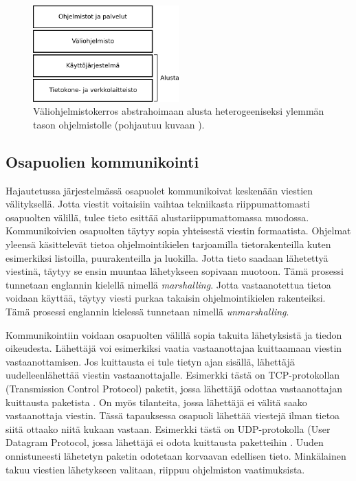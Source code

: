 \begin{figure}[ht!]
	\includegraphics[width=0.5\textwidth]{pictures/middleware-architecture.png}
	\caption{Väliohjelmistokerros abstrahoimaan alusta heterogeeniseksi ylemmän tason ohjelmistolle (pohjautuu kuvaan \mbox{\cite[s.~52]{distributed-systems-concepts-and-design}}).}
	\label{fig:middleware-architecture}
\end{figure}


\subsection{Osapuolien kommunikointi}
Hajautetussa järjestelmässä osapuolet kommunikoivat keskenään viestien välityksellä. Jotta viestit voitaisiin vaihtaa tekniikasta riippumattomasti osapuolten välillä, tulee tieto esittää alustariippumattomassa muodossa. Kommunikoivien osapuolten täytyy sopia yhteisestä viestin formaatista. Ohjelmat yleensä käsittelevät tietoa ohjelmointikielen tarjoamilla tietorakenteilla kuten esimerkiksi listoilla, puurakenteilla ja luokilla. Jotta tieto saadaan lähetettyä viestinä, täytyy se ensin muuntaa lähetykseen sopivaan muotoon. Tämä prosessi tunnetaan englannin kielellä nimellä \emph{marshalling}. Jotta vastaanotettua tietoa voidaan käyttää, täytyy viesti purkaa takaisin ohjelmointikielen rakenteiksi. Tämä prosessi englannin kielessä tunnetaan nimellä \emph{unmarshalling}. \mbox{\cite[s.~158]{distributed-systems-concepts-and-design}}

Kommunikointiin voidaan osapuolten välillä sopia takuita lähetyksistä ja tiedon oikeudesta. Lähettäjä voi esimerkiksi vaatia vastaanottajaa kuittaamaan viestin vastaanottamisen. Jos kuittausta ei tule tietyn ajan sisällä, lähettäjä uudelleenlähettää viestin vastaanottajalle. Esimerkki tästä on TCP-protokollan (Transmission Control Protocol) paketit, jossa lähettäjä odottaa vastaanottajan kuittausta paketista \cite[s.~9--10]{tcp-standard}. On myös tilanteita, jossa lähettäjä ei välitä saako vastaanottaja viestin. Tässä tapauksessa osapuoli lähettää viestejä ilman tietoa siitä ottaako niitä kukaan vastaan. Esimerkki tästä on UDP-protokolla (User Datagram Protocol, jossa lähettäjä ei odota kuittausta paketteihin \cite{udp-standard}. Uuden onnistuneesti lähetetyn paketin odotetaan korvaavan edellisen tieto. Minkälainen takuu viestien lähetykseen valitaan, riippuu ohjelmiston vaatimuksista.


